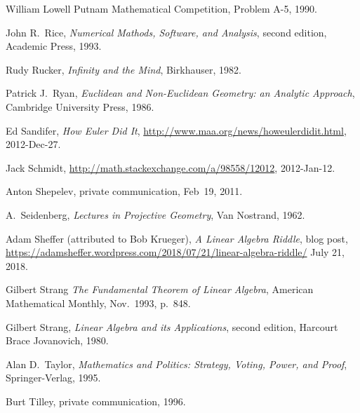 \begin{thebibliography}{\makebox[2em][c]{{}\hfil{}}}
  William Lowell Putnam Mathematical Competition,
  Problem A-5, 1990.

  John R.\ Rice,
  \emph{Numerical Mathods, Software, and Analysis},
  second edition,
  Academic Press,
  1993.


  Rudy Rucker,
  \emph{Infinity and the Mind},
  Birkhauser,
  1982.

  Patrick J.~Ryan,
  \emph{Euclidean and Non-Euclidean Geometry: an Analytic Approach},
  Cambridge University Press, 1986.

  Ed Sandifer,
  \textit{How Euler Did It},
  \url{http://www.maa.org/news/howeulerdidit.html},
  2012-Dec-27.

  Jack Schmidt, %
  \url{http://math.stackexchange.com/a/98558/12012}, 
  2012-Jan-12.

  Anton Shepelev,
  private communication,
  Feb~19, 2011.

  A.~Seidenberg,
  \emph{Lectures in Projective Geometry},
  Van Nostrand, 1962.


  Adam Sheffer (attributed to Bob Krueger), 
  \emph{A Linear Algebra Riddle},
  blog post, 
  \url{https://adamsheffer.wordpress.com/2018/07/21/linear-algebra-riddle/}
  July 21, 2018.

  Gilbert Strang
  \emph{The Fundamental Theorem of Linear Algebra},
  American Mathematical Monthly,
  Nov.~1993, p.~848.

  Gilbert Strang,
  \emph{Linear Algebra and its Applications},
  second edition,
  Harcourt Brace Jovanovich,
  1980.

  Alan D.~Taylor,
  \emph{Mathematics and Politics: Strategy, Voting, Power, and Proof},
  Springer-Verlag,
  1995.

  Burt Tilley,
  private communication,
  1996.


\end{thebibliography}
